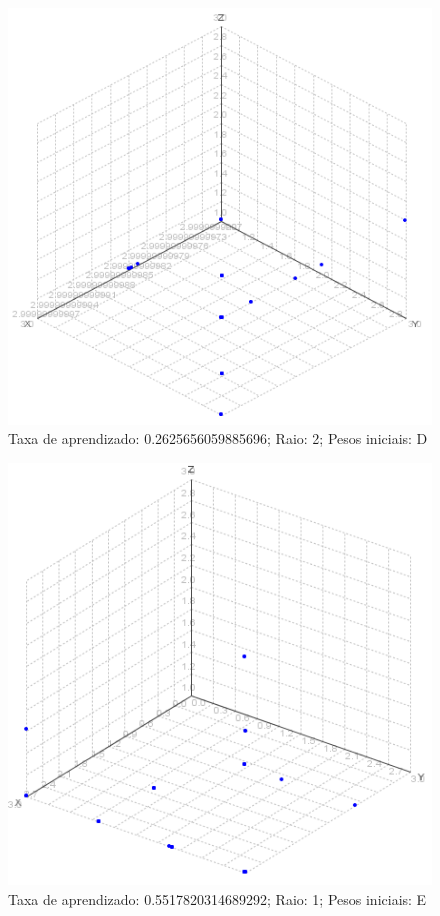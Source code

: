 \begin{figure}[ht!]
	\centering
	\includegraphics[scale=0.65]{./imgs/2d2.png}
	\caption{Taxa de aprendizado: 0.2625656059885696; Raio: 2; Pesos iniciais: D}
\end{figure}

\begin{figure}[ht!]
	\centering
	\includegraphics[scale=0.65]{./imgs/2e1.png}
	\caption{Taxa de aprendizado: 0.5517820314689292; Raio: 1; Pesos iniciais: E}
\end{figure}

